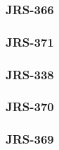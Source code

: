 		\subsubsection{JRS-366}
		\subsubsection{JRS-371}
		\subsubsection{JRS-338}
		\subsubsection{JRS-370}
		\subsubsection{JRS-369}
		
		
		
		
